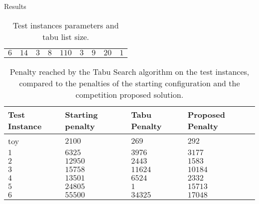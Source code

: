 \begin{section}{Results}
\begin{table}[h]
\begin{tabular}{lllllllll}
         $6$               & $14$          & $3$             & $8$                & $110$             & $3$                                                                   & $9$            & $20$            & $1$                     \\
     \end{tabular}
     \caption{Test instances parameters and tabu list size.}
     \label{tab:parameters}
 \end{table}
 \begin{table}[h]
    \centering
     \begin{tabular}{llll}
         \hline
         \textbf{Test Instance} & \textbf{Starting penalty} & \textbf{Tabu Penalty} & \textbf{Proposed Penalty} \\ \hline
         toy                    & $2100$                    & $269$                 & $292$                     \\
         $1$                    & $6325$                    & $3976$                & $3177$                    \\
         $2$                    & $12950$                   & $2443$                & $1583$                    \\
         $3$                    & $15758$                   & $11624$               & $10184$                   \\
         $4$                    & $13501$                   & $6524$                & $2332$                    \\
         $5$                    & $24805$                   & $1$                   & $15713$                   \\
         $6$                    & $55500$                   & $34325$                   & $17048$                   \\
     \end{tabular}
     \caption{Penalty reached by the Tabu Search algorithm on the test instances, compared to the
         penalties of the starting configuration and the competition proposed solution.}
     \label{tab:penalties}
 \end{table}

\end{section}